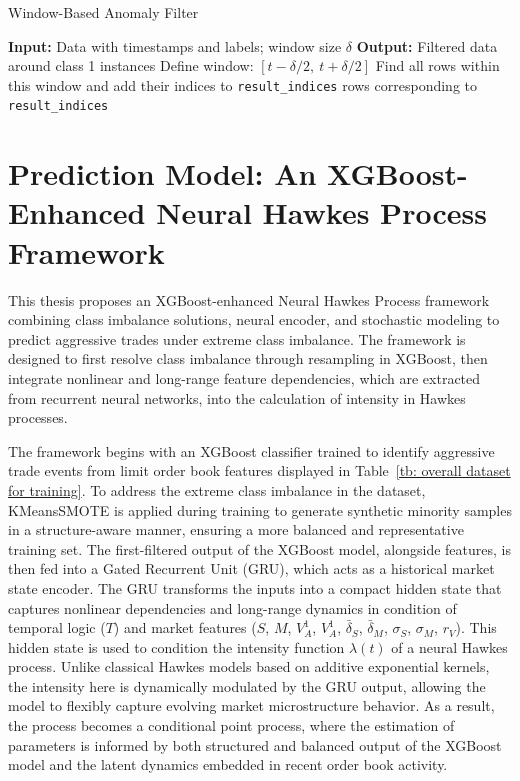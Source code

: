 \begin{algorithm}[H]
\caption{Window-Based Anomaly Filter} \label{al: window-based}
\begin{algorithmic}[1]
\State \textbf{Input:} Data with timestamps and labels; window size $\delta$
\State \textbf{Output:} Filtered data around class 1 instances
    \State Define window: $[t - \delta/2,\ t + \delta/2]$
    \State Find all rows within this window and add their indices to \texttt{result\_indices}
\EndFor
\State \Return rows corresponding to \texttt{result\_indices}
\end{algorithmic}
\end{algorithm}


\section{Prediction Model: An XGBoost-Enhanced Neural Hawkes Process Framework}
This thesis proposes an XGBoost-enhanced Neural Hawkes Process framework combining class imbalance solutions, neural encoder, and stochastic modeling to predict aggressive trades under extreme class imbalance. The framework is designed to first resolve class imbalance through resampling in XGBoost, then integrate nonlinear and long-range feature dependencies, which are extracted from recurrent neural networks, into the calculation of intensity in Hawkes processes. 

The framework begins with an XGBoost classifier trained to identify aggressive trade events from limit order book features displayed in Table~\ref{tb: overall dataset for training}. To address the extreme class imbalance in the dataset, KMeansSMOTE is applied during training to generate synthetic minority samples in a structure-aware manner, ensuring a more balanced and representative training set. The first-filtered output of the XGBoost model, alongside features, is then fed into a Gated Recurrent Unit (GRU), which acts as a historical market state encoder. The GRU transforms the inputs into a compact hidden state that captures nonlinear dependencies and long-range dynamics in condition of temporal logic ($T$) and market features ($S$, $M$, $V_A^{1}$, $V_A^{1}$, $\bar{\delta}_S$, $\bar{\delta}_M$, $\sigma_S$, $\sigma_M$, $r_V$). This hidden state is used to condition the intensity function $\lambda(t)$ of a neural Hawkes process. Unlike classical Hawkes models based on additive exponential kernels, the intensity here is dynamically modulated by the GRU output, allowing the model to flexibly capture evolving market microstructure behavior. As a result, the process becomes a conditional point process, where the estimation of parameters is informed by both structured and balanced output of the XGBoost model and the latent dynamics embedded in recent order book activity.


